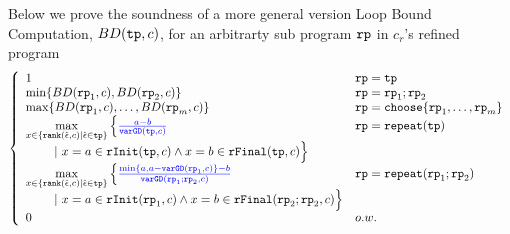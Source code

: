 Below we prove the soundness of a more general version Loop Bound Computation, $BD(\mathtt{tp}, c)$, for an arbitrarty sub program $\mathtt{rp}$ in $c_r$'s refined program
\[
  \left\{
  \begin{array}{lll}
    1 &  \rprog = \tpath\\
    \min \left\{BD(\rprog_1, c), BD(\rprog_2, c) \right\} & \rprog = \rprog_1;\rprog_2\\
    \max\left\{ BD(\rprog_1, c), \ldots, BD(\rprog_m, c) \right\} & \rprog = \rpchoose{\rprog_1, \ldots, \rprog_m } 
    \\
    \max\limits_{x \in \left\{ \locbound(\absevent, c) | \absevent \in \tpath \right\}} 
    \Big\{ \highlight{\frac{a - b}{\varGD(\tpath, c)}}  &  \rprog = \rprepeat(\tpath)
    \\ \qquad 
    ~\vert~
    x = a \in \rfinit(\tpath, c)
    \land x = b \in \rffinal(\tpath, c)
    \Big\} 
    \\
  \max\limits_{x \in \left\{ \locbound(\absevent, c) | \absevent \in \tpath \right\}} 
    \Big\{ \highlight{\frac{\min\{ a, a - \varGD(\rprog_1, c) \} - b}{\varGD(\rprog_1;\rprog_2, c)}}  
    &  \rprog = \rprepeat(\rprog_1;\rprog_2)
    \\ \qquad 
    ~\vert~
    x = a \in \rfinit(\rprog_1, c)
    \land x = b \in \rffinal(\rprog_2;\rprog_2, c)
    \Big\}   \\
  0  &  o.w.
\end{array}
\right.
\]
 
